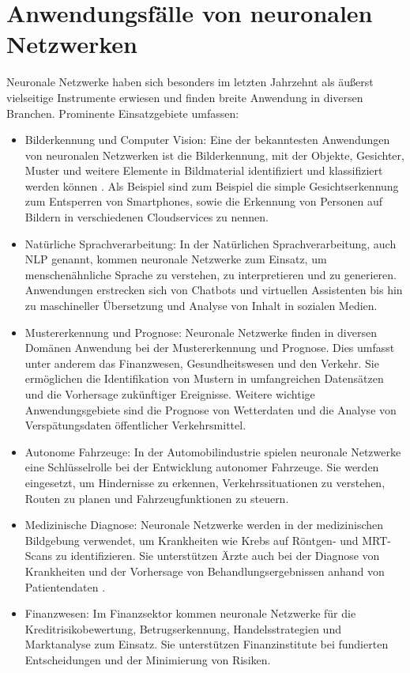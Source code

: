 \section{Anwendungsfälle von neuronalen Netzwerken}
\label{sec:Grundlagen_Anwendungsfälle}

Neuronale Netzwerke haben sich besonders im letzten Jahrzehnt als äußerst vielseitige Instrumente erwiesen und finden breite Anwendung in diversen Branchen. Prominente Einsatzgebiete umfassen:

\begin{itemize} 

\item Bilderkennung und Computer Vision: Eine der bekanntesten Anwendungen von neuronalen Netzwerken ist die Bilderkennung, mit der Objekte, Gesichter, Muster und weitere Elemente in Bildmaterial identifiziert und klassifiziert werden können \citep{LeCun_Deep_Learning}. Als Beispiel sind zum Beispiel die simple Gesichtserkennung zum Entsperren von Smartphones, sowie die Erkennung von Personen auf Bildern in verschiedenen Cloudservices zu nennen.

\item Natürliche Sprachverarbeitung: In der Natürlichen Sprachverarbeitung, auch NLP genannt, kommen neuronale Netzwerke zum Einsatz, um menschenähnliche Sprache zu verstehen, zu interpretieren und zu generieren. Anwendungen erstrecken sich von Chatbots und virtuellen Assistenten bis hin zu maschineller Übersetzung und Analyse von Inhalt in sozialen Medien.

\item Mustererkennung und Prognose: Neuronale Netzwerke finden in diversen Domänen Anwendung bei der Mustererkennung und Prognose. Dies umfasst unter anderem das Finanzwesen, Gesundheitswesen und den Verkehr. Sie ermöglichen die Identifikation von Mustern in umfangreichen Datensätzen und die Vorhersage zukünftiger Ereignisse. Weitere wichtige Anwendungsgebiete sind die Prognose von Wetterdaten und die Analyse von Verspätungsdaten öffentlicher Verkehrsmittel.

\item Autonome Fahrzeuge: In der Automobilindustrie spielen neuronale Netzwerke eine Schlüsselrolle bei der Entwicklung autonomer Fahrzeuge. Sie werden eingesetzt, um Hindernisse zu erkennen, Verkehrssituationen zu verstehen, Routen zu planen und Fahrzeugfunktionen zu steuern.

\item Medizinische Diagnose: Neuronale Netzwerke werden in der medizinischen Bildgebung verwendet, um Krankheiten wie Krebs auf Röntgen- und MRT-Scans zu identifizieren. Sie unterstützen Ärzte auch bei der Diagnose von Krankheiten und der Vorhersage von Behandlungsergebnissen anhand von Patientendaten \citep{LeCun_Deep_Learning}.

\item Finanzwesen: Im Finanzsektor kommen neuronale Netzwerke für die Kreditrisikobewertung, Betrugserkennung, Handelsstrategien und Marktanalyse zum Einsatz. Sie unterstützen Finanzinstitute bei fundierten Entscheidungen und der Minimierung von Risiken.

\end{itemize}

